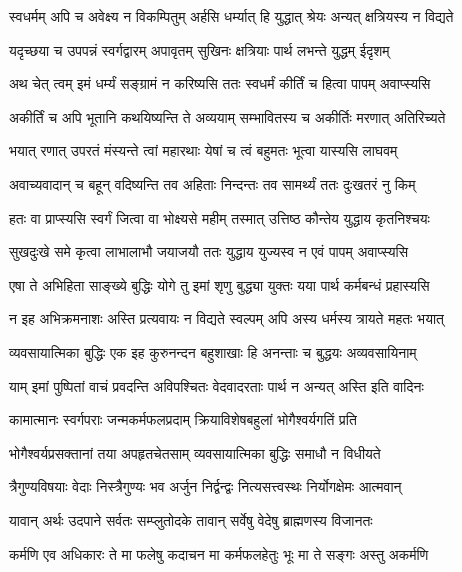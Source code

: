 \twolineshloka
{स्वधर्मम् अपि च अवेक्ष्य न विकम्पितुम् अर्हसि}
{धर्म्यात् हि युद्धात् श्रेयः अन्यत् क्षत्रियस्य न विद्यते}%

\twolineshloka
{यदृच्छया च उपपन्नं स्वर्गद्वारम् अपावृतम्}
{सुखिनः क्षत्रियाः पार्थ लभन्ते युद्धम् ईदृशम्}%

\twolineshloka
{अथ चेत् त्वम् इमं धर्म्यं सङ्ग्रामं न करिष्यसि}
{ततः स्वधर्मं कीर्तिं च हित्वा पापम् अवाप्स्यसि}%

\twolineshloka
{अकीर्तिं च अपि भूतानि कथयिष्यन्ति ते अव्ययाम्}
{सम्भावितस्य च अकीर्तिः मरणात् अतिरिच्यते}%

\twolineshloka
{भयात् रणात् उपरतं मंस्यन्ते त्वां महारथाः}
{येषां च त्वं बहुमतः भूत्वा यास्यसि लाघवम्}%

\twolineshloka
{अवाच्यवादान् च बहून् वदिष्यन्ति तव अहिताः}
{निन्दन्तः तव सामर्थ्यं ततः दुःखतरं नु किम्}%

\twolineshloka
{हतः वा प्राप्स्यसि स्वर्गं जित्वा वा भोक्ष्यसे महीम्}
{तस्मात् उत्तिष्ठ कौन्तेय युद्धाय कृतनिश्चयः}%

\twolineshloka
{सुखदुःखे समे कृत्वा लाभालाभौ जयाजयौ}
{ततः युद्धाय युज्यस्व न एवं पापम् अवाप्स्यसि}%

\twolineshloka
{एषा ते अभिहिता साङ्ख्ये बुद्धिः योगे तु इमां शृणु}
{बुद्ध्या युक्तः यया पार्थ कर्मबन्धं प्रहास्यसि}%

\twolineshloka
{न इह अभिक्रमनाशः अस्ति प्रत्यवायः न विद्यते}
{स्वल्पम् अपि अस्य धर्मस्य त्रायते महतः भयात्}%

\twolineshloka
{व्यवसायात्मिका बुद्धिः एक इह कुरुनन्दन}
{बहुशाखाः हि अनन्ताः च बुद्धयः अव्यवसायिनाम्}%

\twolineshloka
{याम् इमां पुष्पितां वाचं प्रवदन्ति अविपश्चितः}
{वेदवादरताः पार्थ न अन्यत् अस्ति इति वादिनः}%

\twolineshloka
{कामात्मानः स्वर्गपराः जन्मकर्मफलप्रदाम्}
{क्रियाविशेषबहुलां भोगैश्वर्यगतिं प्रति}%

\twolineshloka
{भोगैश्वर्यप्रसक्तानां तया अपहृतचेतसाम्}
{व्यवसायात्मिका बुद्धिः समाधौ न विधीयते}%

\twolineshloka
{त्रैगुण्यविषयाः वेदाः निस्त्रैगुण्यः भव अर्जुन}
{निर्द्वन्द्वः नित्यसत्त्वस्थः निर्योगक्षेमः आत्मवान्}%

\twolineshloka
{यावान् अर्थः उदपाने सर्वतः सम्प्लुतोदके}
{तावान् सर्वेषु वेदेषु ब्राह्मणस्य विजानतः}%

\twolineshloka
{कर्मणि एव अधिकारः ते मा फलेषु कदाचन}
{मा कर्मफलहेतुः भूः मा ते सङ्गः अस्तु अकर्मणि}%


